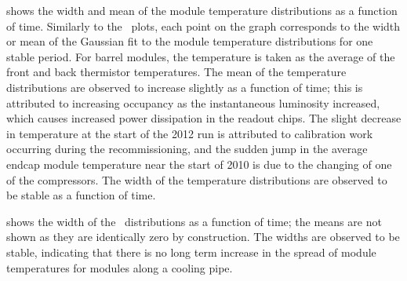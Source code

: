  shows the width and mean of the module temperature
distributions as a function of time. Similarly to the \deltat\ plots, each point
on the graph corresponds to the width or mean of the Gaussian fit to the module
temperature distributions for one stable period. For barrel modules, the
temperature is taken as the average of the front and back thermistor
temperatures. The mean of the temperature distributions are observed to increase
slightly as a function of time; this is attributed to increasing occupancy as
the instantaneous luminosity increased, which causes increased power dissipation
in the readout chips. The slight decrease in temperature at the start of the
2012 run is attributed to calibration work occurring during the recommissioning,
and the sudden jump in the average endcap module temperature near the start of
2010 is due to the changing of one of the compressors.  The width of the
temperature distributions are observed to be
stable as a function of time.

 shows the width of the \tdiff\
distributions as a function of time; the means are not shown as they are
identically zero by construction. The widths are observed to be stable, indicating
that there is no long term increase in the spread of module temperatures for
modules along a cooling pipe.

